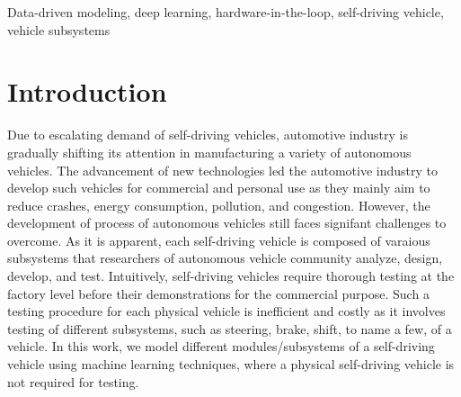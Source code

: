\documentclass[conference]{IEEEtran}
\begin{document}
\begin{IEEEkeywords}
Data-driven modeling, deep learning, hardware-in-the-loop, self-driving vehicle, vehicle subsystems
\end{IEEEkeywords}

\section{Introduction}
\label{sec:introduction}


Due to escalating demand of self-driving vehicles, automotive industry is gradually shifting its attention in  manufacturing a variety of autonomous vehicles. The advancement of new technologies led the automotive industry to develop such vehicles for commercial and personal use as they mainly aim to reduce crashes, energy consumption, pollution, and congestion. However, the development of process of autonomous vehicles still faces signifant challenges to overcome. As it is apparent, each self-driving vehicle is composed of varaious subsystems that researchers of autonomous vehicle community analyze, design, develop, and test.  Intuitively, self-driving vehicles require thorough testing at the factory level before their demonstrations for  the commercial purpose. Such a testing procedure for each physical vehicle is inefficient and costly as it involves testing of different subsystems, such as steering, brake, shift, to name a few, of a vehicle. In this work, we model different modules/subsystems of a self-driving vehicle using machine learning techniques, where a physical self-driving vehicle is not required for testing.
\end{document}
